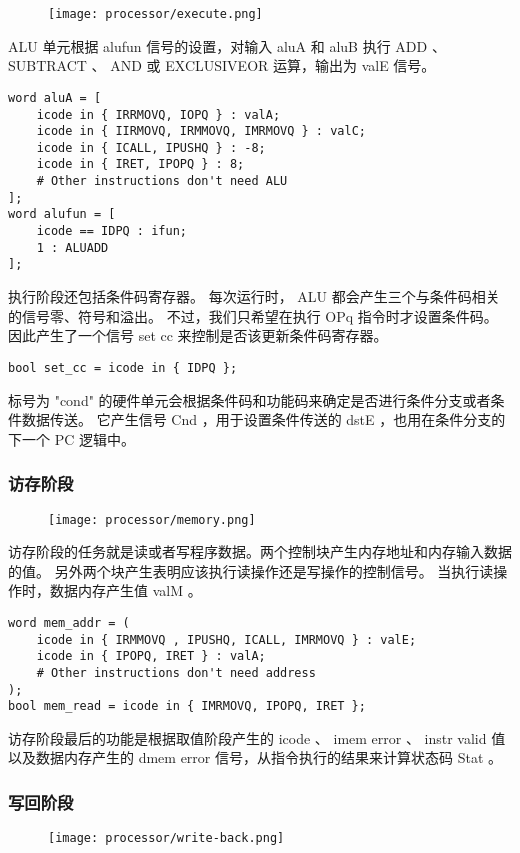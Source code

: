 \begin{figure}[H]
    \centering
    \texttt{[image: processor/execute.png]}
\end{figure}

ALU 单元根据 alufun 信号的设置，对输入 aluA 和 aluB 执行 ADD 、 SUBTRACT 、 AND 或 EXCLUSIVEOR 运算，输出为 valE 信号。
\begin{lstlisting}[style=CStyle]
word aluA = [
    icode in { IRRMOVQ, IOPQ } : valA;
    icode in { IIRMOVQ, IRMMOVQ, IMRMOVQ } : valC;
    icode in { ICALL, IPUSHQ } : -8;
    icode in { IRET, IPOPQ } : 8;
    # Other instructions don't need ALU
];
word alufun = [
    icode == IDPQ : ifun;
    1 : ALUADD
];
\end{lstlisting}

执行阶段还包括条件码寄存器。
每次运行时， ALU 都会产生三个与条件码相关的信号零、符号和溢出。
不过，我们只希望在执行 OPq 指令时才设置条件码。
因此产生了一个信号 set cc 来控制是否该更新条件码寄存器。
\begin{lstlisting}[style=CStyle]
bool set_cc = icode in { IDPQ };
\end{lstlisting}

标号为 "cond" 的硬件单元会根据条件码和功能码来确定是否进行条件分支或者条件数据传送。
它产生信号 Cnd ，用于设置条件传送的 dstE ，也用在条件分支的下一个 PC 逻辑中。

\subsubsection{访存阶段}
\begin{figure}[H]
    \centering
    \texttt{[image: processor/memory.png]}
\end{figure}

访存阶段的任务就是读或者写程序数据。两个控制块产生内存地址和内存输入数据的值。
另外两个块产生表明应该执行读操作还是写操作的控制信号。
当执行读操作时，数据内存产生值 valM 。
\begin{lstlisting}[style=CStyle]
word mem_addr = (
    icode in { IRMMOVQ , IPUSHQ, ICALL, IMRMOVQ } : valE;
    icode in { IPOPQ, IRET } : valA;
    # Other instructions don't need address
);
bool mem_read = icode in { IMRMOVQ, IPOPQ, IRET };
\end{lstlisting}

访存阶段最后的功能是根据取值阶段产生的 icode 、 imem error 、 instr valid 值
以及数据内存产生的 dmem error 信号，从指令执行的结果来计算状态码 Stat 。

\subsubsection{写回阶段}
\begin{figure}[H]
    \centering
    \texttt{[image: processor/write-back.png]}
\end{figure}

